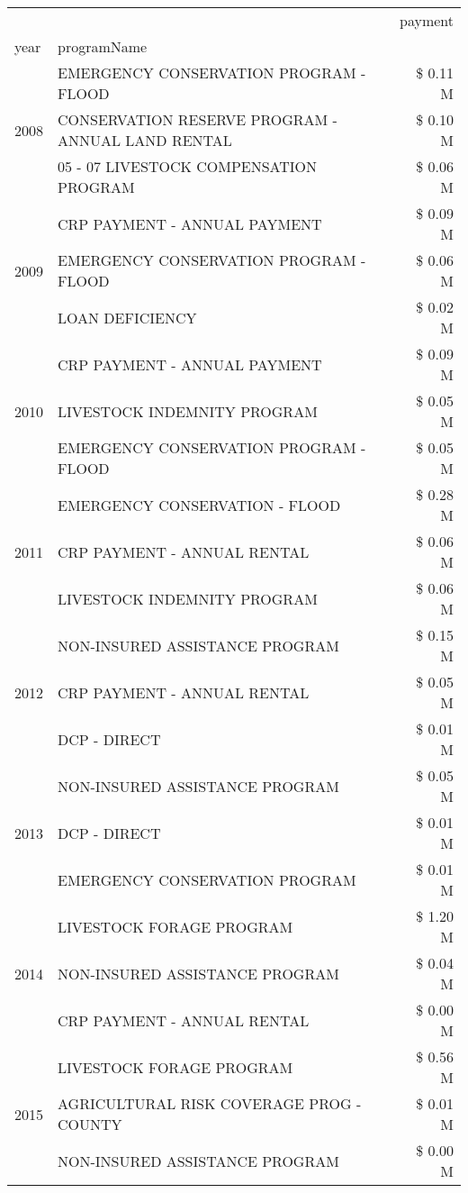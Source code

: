 \begin{tabular}{llr}
\toprule
 &  & payment \\
year & programName &  \\
\midrule
\multirow[t]{3}{*}{2008} & EMERGENCY CONSERVATION PROGRAM - FLOOD & \$ 0.11 M \\
 & CONSERVATION RESERVE PROGRAM - ANNUAL LAND RENTAL & \$ 0.10 M \\
 & 05 - 07 LIVESTOCK COMPENSATION PROGRAM & \$ 0.06 M \\
\cline{1-3}
\multirow[t]{3}{*}{2009} & CRP PAYMENT - ANNUAL PAYMENT & \$ 0.09 M \\
 & EMERGENCY CONSERVATION PROGRAM - FLOOD & \$ 0.06 M \\
 & LOAN DEFICIENCY & \$ 0.02 M \\
\cline{1-3}
\multirow[t]{3}{*}{2010} & CRP PAYMENT - ANNUAL PAYMENT & \$ 0.09 M \\
 & LIVESTOCK INDEMNITY PROGRAM & \$ 0.05 M \\
 & EMERGENCY CONSERVATION PROGRAM - FLOOD & \$ 0.05 M \\
\cline{1-3}
\multirow[t]{3}{*}{2011} & EMERGENCY CONSERVATION - FLOOD & \$ 0.28 M \\
 & CRP PAYMENT - ANNUAL RENTAL & \$ 0.06 M \\
 & LIVESTOCK INDEMNITY PROGRAM & \$ 0.06 M \\
\cline{1-3}
\multirow[t]{3}{*}{2012} & NON-INSURED ASSISTANCE PROGRAM & \$ 0.15 M \\
 & CRP PAYMENT - ANNUAL RENTAL & \$ 0.05 M \\
 & DCP - DIRECT & \$ 0.01 M \\
\cline{1-3}
\multirow[t]{3}{*}{2013} & NON-INSURED ASSISTANCE PROGRAM & \$ 0.05 M \\
 & DCP - DIRECT & \$ 0.01 M \\
 & EMERGENCY CONSERVATION PROGRAM & \$ 0.01 M \\
\cline{1-3}
\multirow[t]{3}{*}{2014} & LIVESTOCK FORAGE PROGRAM & \$ 1.20 M \\
 & NON-INSURED ASSISTANCE PROGRAM & \$ 0.04 M \\
 & CRP PAYMENT - ANNUAL RENTAL & \$ 0.00 M \\
\cline{1-3}
\multirow[t]{3}{*}{2015} & LIVESTOCK FORAGE PROGRAM & \$ 0.56 M \\
 & AGRICULTURAL RISK COVERAGE PROG - COUNTY & \$ 0.01 M \\
 & NON-INSURED ASSISTANCE PROGRAM & \$ 0.00 M \\
\cline{1-3}

\end{tabular}
